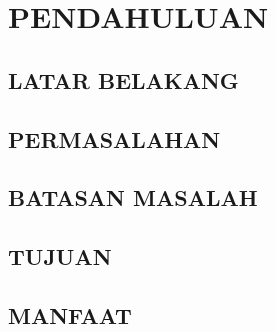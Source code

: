 \documentclass[12pt,a4paper,oneside,openany]{report}
\begin{document}
\chapter{PENDAHULUAN}
\label{chap:bab1}

\section{LATAR BELAKANG}
\label{sec:latar-belakang}

\section{PERMASALAHAN}
\label{sec:permasalahan}

\section{BATASAN MASALAH}
\label{sec:batasan-masalah}

\section{TUJUAN}
\label{sec:tujuan}

\section{MANFAAT}
\label{sec:manfaat}
\end{document}
